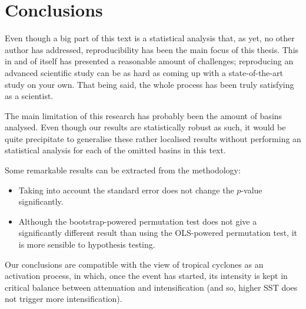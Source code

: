 \section{Conclusions}

Even though a big part of this text is a statistical analysis that, as yet, no other author has addressed, reproducibility has been the main focus of this thesis. This in and of itself has presented a reasonable amount of challenges; reproducing an advanced scientific study can be as hard as coming up with a state-of-the-art study on your own.
That being said, the whole process has been truly satisfying as a scientist.


The main limitation of this research has probably been the amount of basins analysed. Even though our results are statistically robust as such, it would be quite precipitate to generalise these rather localised results without performing an statistical analysis for each of the omitted basins in this text.

Some remarkable results can be extracted from the methodology:
\begin{itemize}
	\item Taking into account the standard error does not change the $p$-value significantly.
	\item Although the bootstrap-powered permutation test does not give a significantly different result than using the OLS-powered permutation test, it is more sensible to hypothesis testing.
\end{itemize}

Our conclusions are compatible with the view of tropical cyclones as an activation process, in which, once the event has started, its intensity is kept in critical balance between attenuation and intensification (and so, higher SST does not trigger more intensification).
